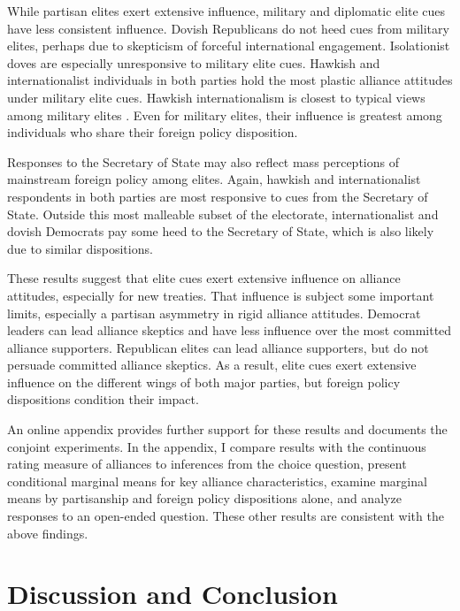 \documentclass[12pt]{article}
\begin{document}
While partisan elites exert extensive influence, military and diplomatic elite cues have less consistent influence. 
Dovish Republicans do not heed cues from military elites, perhaps due to skepticism of forceful international engagement.
Isolationist doves are especially unresponsive to military elite cues.
Hawkish and internationalist individuals in both parties hold the most plastic alliance attitudes under military elite cues.
Hawkish internationalism is closest to typical views among military elites \citep{ZwaldBerejikian2021}. 
Even for military elites, their influence is greatest among individuals who share their foreign policy disposition. 


Responses to the Secretary of State may also reflect mass perceptions of mainstream foreign policy among elites.
Again, hawkish and internationalist respondents in both parties are most responsive to cues from the Secretary of State.
Outside this most malleable subset of the electorate, internationalist and dovish Democrats pay some heed to the Secretary of State, which is also likely due to similar dispositions.


These results suggest that elite cues exert extensive influence on alliance attitudes, especially for new treaties.
That influence is subject some important limits, especially a partisan asymmetry in rigid alliance attitudes. 
Democrat leaders can lead alliance skeptics and have less influence over the most committed alliance supporters. 
Republican elites can lead alliance supporters, but do not persuade committed alliance skeptics. 
As a result, elite cues exert extensive influence on the different wings of both major parties, but foreign policy dispositions condition their impact. 


An online appendix provides further support for these results and documents the conjoint experiments. 
In the appendix, I compare results with the continuous rating measure of alliances to inferences from the choice question, present conditional marginal means for key alliance characteristics, examine marginal means by partisanship and foreign policy dispositions alone, and analyze responses to an open-ended question. 
These other results are consistent with the above findings. 


\section{Discussion and Conclusion} 
\end{document}
